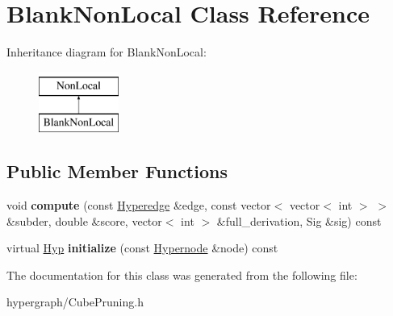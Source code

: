 \hypertarget{class_blank_non_local}{
\section{BlankNonLocal Class Reference}
\label{class_blank_non_local}
}
Inheritance diagram for BlankNonLocal:\begin{figure}[H]
\begin{center}
\leavevmode
\includegraphics[height=2cm]{class_blank_non_local}
\end{center}
\end{figure}
\subsection*{Public Member Functions}
\begin{DoxyCompactItemize}
\item 
\hypertarget{class_blank_non_local_ab48fb9f176d5b929aaa724e3f5b32a6a}{
void {\bfseries compute} (const \hyperlink{class_scarab_1_1_h_g_1_1_hyperedge}{Hyperedge} \&edge, const vector$<$ vector$<$ int $>$ $>$ \&subder, double \&score, vector$<$ int $>$ \&full\_\-derivation, Sig \&sig) const }
\label{class_blank_non_local_ab48fb9f176d5b929aaa724e3f5b32a6a}

\item 
\hypertarget{class_blank_non_local_a61e2ac11c599d217cacfa5c54bd191b8}{
virtual \hyperlink{struct_hyp}{Hyp} {\bfseries initialize} (const \hyperlink{class_scarab_1_1_h_g_1_1_hypernode}{Hypernode} \&node) const }
\label{class_blank_non_local_a61e2ac11c599d217cacfa5c54bd191b8}

\end{DoxyCompactItemize}


The documentation for this class was generated from the following file:\begin{DoxyCompactItemize}
\item 
hypergraph/CubePruning.h\end{DoxyCompactItemize}

